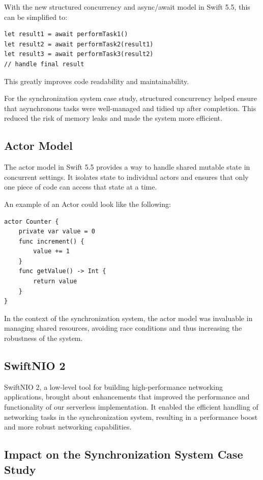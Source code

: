 With the new structured concurrency and async/await model in Swift 5.5, this can be simplified to:

\begin{verbatim}
let result1 = await performTask1()
let result2 = await performTask2(result1)
let result3 = await performTask3(result2)
// handle final result
\end{verbatim}

This greatly improves code readability and maintainability.

For the synchronization system case study, structured concurrency helped ensure that asynchronous tasks were well-managed and tidied up after completion. This reduced the risk of memory leaks and made the system more efficient.

\subsection{Actor Model}
\label{subsec:ActorModel}

The actor model in Swift 5.5 provides a way to handle shared mutable state in concurrent settings. It isolates state to individual actors and ensures that only one piece of code can access that state at a time.

An example of an Actor could look like the following:

\begin{verbatim}
actor Counter {
	private var value = 0
	func increment() {
		value += 1
	}
	func getValue() -> Int {
		return value
	}
}
\end{verbatim}

In the context of the synchronization system, the actor model was invaluable in managing shared resources, avoiding race conditions and thus increasing the robustness of the system.

\subsection{SwiftNIO 2}
\label{subsec:SwiftNIO}

SwiftNIO 2, a low-level tool for building high-performance networking applications, brought about enhancements that improved the performance and functionality of our serverless implementation. It enabled the efficient handling of networking tasks in the synchronization system, resulting in a performance boost and more robust networking capabilities.

\subsection{Impact on the Synchronization System Case Study}
\label{subsec:ImpactCaseStudy}


